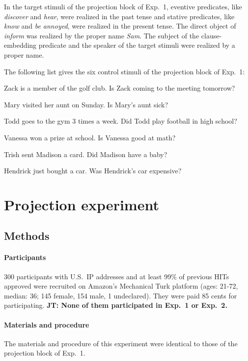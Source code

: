 \documentclass[11pt,fleqn]{article}
\newcommand{\6}{\mbox{$[\hspace*{-.6mm}[$}}
\newcommand{\9}{\mbox{$]\hspace*{-.6mm}]$}}
\newcommand{\jt}[1]{\textbf{\color{blue}JT: #1}}
\begin{document}
In the target stimuli of the projection block of Exp.~1, eventive predicates, like {\em discover} and {\em hear}, were realized in the past tense and stative predicates, like {\em know} and {\em be annoyed}, were realized in the present tense. The direct object of {\em inform} was realized by the proper name {\em Sam}. The subject of the clause-embedding predicate and the speaker of the target stimuli were realized by a proper name. 

\bigskip
\noindent
The following list gives the six control stimuli of the projection block of Exp.~1: 

\begin{enumerate}[leftmargin=3ex,itemsep=-2pt]
  Zack is a member of the golf club. Is Zack coming to the meeting tomorrow?

 Mary visited her aunt on Sunday. Is Mary's aunt sick?

 Todd goes to the gym 3 times a week. Did Todd play football in high school?

 Vanessa won a prize at school. Is Vanessa good at math?

 Trish sent Madison a card. Did Madison have a baby?

 Hendrick just bought a car. Was Hendrick's car expensive?
\end{enumerate}

\section{Projection experiment}\label{a-proj}

\subsection{Methods}

\paragraph{Participants} 300 participants with U.S.\ IP addresses and at least 99\% of previous HITs approved were recruited on Amazon's Mechanical Turk platform (ages: 21-72, median: 36; 145 female, 154 male, 1 undeclared). They were paid 85 cents for participating. \jt{None of them participated in Exp.~1 or Exp.~2.}

\paragraph{Materials and procedure} The materials and procedure of this experiment were identical to those of the projection block of Exp.~1. 
\end{document}
